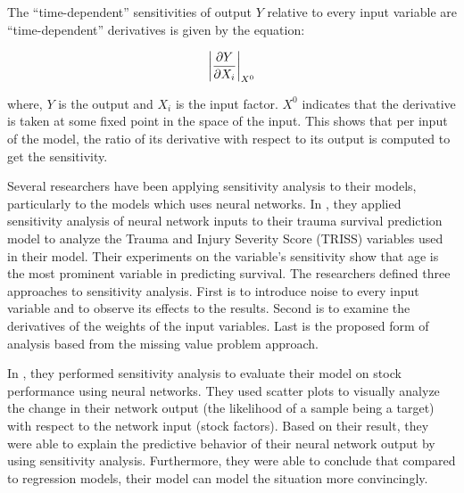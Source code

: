 The “time-dependent” sensitivities of output $Y$ relative to every input variable are “time-dependent” derivatives is given by the equation:

\begin{comment}

\begin{equation}
\frac{\partial a}{\partial b},
\qquad
\frac{\partial a}{\partial c}
\end{equation}

\end{comment}

\begin{equation}
\abs*{\frac{\partial Y}{\partial X_i}}_{X^0}
\end{equation}

\noindent where, $Y$ is the output and $X_i$ is the input factor. $X^0$ indicates that the derivative is taken at some fixed point in the space of the input. This shows that per input of the model, the ratio of its derivative with respect to its output is computed to get the sensitivity.

\begin{comment}
\noindent where, the $\partial a$ is the output and the $\partial b$ and $\partial c$ are the inputs of neural networks. This shows that per input of the model, the ratio of its derivative with respect to its output is computed to get the sensitivity.
\end{comment}

Several researchers have been applying sensitivity analysis to their models, particularly to the models which uses neural networks. In , they applied sensitivity analysis of neural network inputs to their trauma survival prediction model to analyze the Trauma and Injury Severity Score (TRISS) variables used in their model. Their experiments on the variable’s sensitivity show that age is the most prominent variable in predicting survival. The researchers defined three approaches to sensitivity analysis. First is to introduce noise to every input variable and to observe its effects to the results. Second is to examine the derivatives of the weights of the input variables. Last is the proposed form of analysis based from the missing value problem approach. 

In , they performed sensitivity analysis to evaluate their model on stock performance using neural networks. They used scatter plots to visually analyze the change in their network output (the likelihood of a sample being a target) with respect to the network input (stock factors). Based on their result, they were able to explain the predictive behavior of their neural network output by using sensitivity analysis. Furthermore, they were able to conclude that compared to regression models, their model can model the situation more convincingly.

